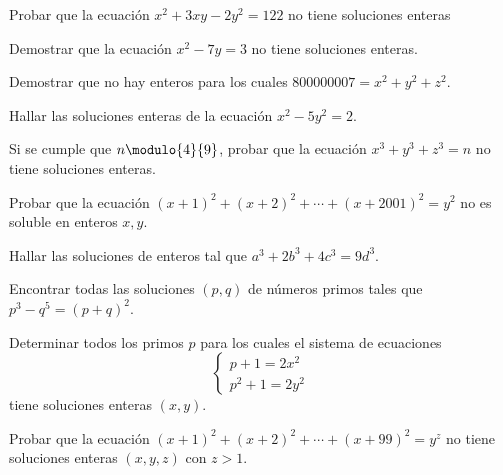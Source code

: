 \begin{exercise}
    Probar que la ecuación $x^2 + 3xy - 2y^2 = 122$ no tiene soluciones enteras
\end{exercise}

\begin{exercise}
    Demostrar que la ecuación $x^2 - 7y = 3$ no tiene soluciones enteras.
\end{exercise}

\begin{exercise}
    Demostrar que no hay enteros para los cuales $800000007 = x^2 + y^2 + z^2$.
\end{exercise}

\begin{exercise}
    Hallar las soluciones enteras de la ecuación $x^2 - 5y^2 = 2$.
\end{exercise}

\begin{exercise}
    Si se cumple que $n \modulo{4}{9}$, probar que la ecuación $x^3 + y^3 + z^3 = n$ no tiene soluciones enteras.
\end{exercise}

\begin{exercise}
    Probar que la ecuación $(x + 1)^2 + (x + 2)^2 + \cdots + (x + 2001)^2 = y^2$ no es soluble en enteros $x,y$.
\end{exercise}

\begin{exercise}
    Hallar las soluciones de enteros tal que $a^3 + 2b^3 + 4c^3 = 9d^3$.
\end{exercise}

\begin{exercise}
    Encontrar todas las soluciones $(p,q)$ de números primos tales que $p^3 - q^5 = (p + q)^2$.
\end{exercise}

\begin{exercise}
    Determinar todos los primos $p$ para los cuales el sistema de ecuaciones
    \[
        \begin{cases}
            p + 1 = 2x^2\\
            p^2 + 1 = 2y^2
        \end{cases}
    \]
    tiene soluciones enteras $(x,y)$.
\end{exercise}

\begin{exercise}
    Probar que la ecuación $(x + 1)^2 + (x + 2)^2 + \cdots + (x + 99)^2 = y^z$ no tiene soluciones enteras $(x,y,z)$ con $z > 1$.
\end{exercise}

